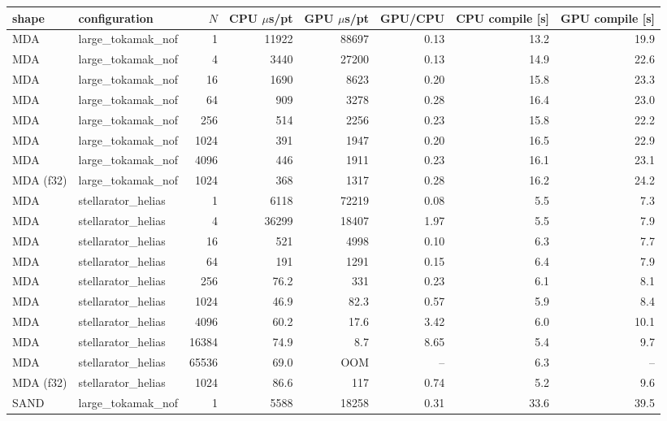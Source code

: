 \begin{tabular}{llrrrrrr}
\toprule
shape & configuration & $N$ & CPU $\mu$s/pt & GPU $\mu$s/pt & GPU/CPU & CPU compile [s] & GPU compile [s] \\
\midrule
MDA & large\_tokamak\_nof & 1 & 11922 & 88697 & 0.13 & 13.2 & 19.9 \\
MDA & large\_tokamak\_nof & 4 & 3440 & 27200 & 0.13 & 14.9 & 22.6 \\
MDA & large\_tokamak\_nof & 16 & 1690 & 8623 & 0.20 & 15.8 & 23.3 \\
MDA & large\_tokamak\_nof & 64 & 909 & 3278 & 0.28 & 16.4 & 23.0 \\
MDA & large\_tokamak\_nof & 256 & 514 & 2256 & 0.23 & 15.8 & 22.2 \\
MDA & large\_tokamak\_nof & 1024 & 391 & 1947 & 0.20 & 16.5 & 22.9 \\
MDA & large\_tokamak\_nof & 4096 & 446 & 1911 & 0.23 & 16.1 & 23.1 \\
MDA (f32) & large\_tokamak\_nof & 1024 & 368 & 1317 & 0.28 & 16.2 & 24.2 \\
MDA & stellarator\_helias & 1 & 6118 & 72219 & 0.08 & 5.5 & 7.3 \\
MDA & stellarator\_helias & 4 & 36299 & 18407 & 1.97 & 5.5 & 7.9 \\
MDA & stellarator\_helias & 16 & 521 & 4998 & 0.10 & 6.3 & 7.7 \\
MDA & stellarator\_helias & 64 & 191 & 1291 & 0.15 & 6.4 & 7.9 \\
MDA & stellarator\_helias & 256 & 76.2 & 331 & 0.23 & 6.1 & 8.1 \\
MDA & stellarator\_helias & 1024 & 46.9 & 82.3 & 0.57 & 5.9 & 8.4 \\
MDA & stellarator\_helias & 4096 & 60.2 & 17.6 & 3.42 & 6.0 & 10.1 \\
MDA & stellarator\_helias & 16384 & 74.9 & 8.7 & 8.65 & 5.4 & 9.7 \\
MDA & stellarator\_helias & 65536 & 69.0 & OOM & -- & 6.3 & -- \\
MDA (f32) & stellarator\_helias & 1024 & 86.6 & 117 & 0.74 & 5.2 & 9.6 \\
SAND & large\_tokamak\_nof & 1 & 5588 & 18258 & 0.31 & 33.6 & 39.5 \\

\end{tabular}
